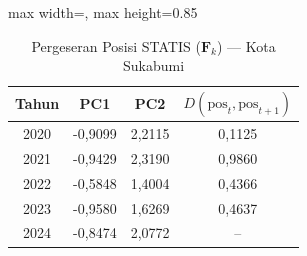 \begin{table}[H]
\centering
\caption{Pergeseran Posisi STATIS ($\mathbf{F}_k$) --- Kota Sukabumi} \label{tab:app2jarak_statis_skor_kota_sukabumi}
\begin{adjustbox}{max width=\textwidth, max height=0.85\textheight}
\begin{tabular}{|c|c|c|c|}
\hline
\textbf{Tahun} & \textbf{PC1} & \textbf{PC2} & \textbf{$D(\text{pos}_t, \text{pos}_{t+1})$} \\
\hline
2020 & -0,9099 & 2,2115 & 0,1125 \\
2021 & -0,9429 & 2,3190 & 0,9860 \\
2022 & -0,5848 & 1,4004 & 0,4366 \\
2023 & -0,9580 & 1,6269 & 0,4637 \\
2024 & -0,8474 & 2,0772 & -- \\
\hline
\end{tabular}
\end{adjustbox}
\end{table}